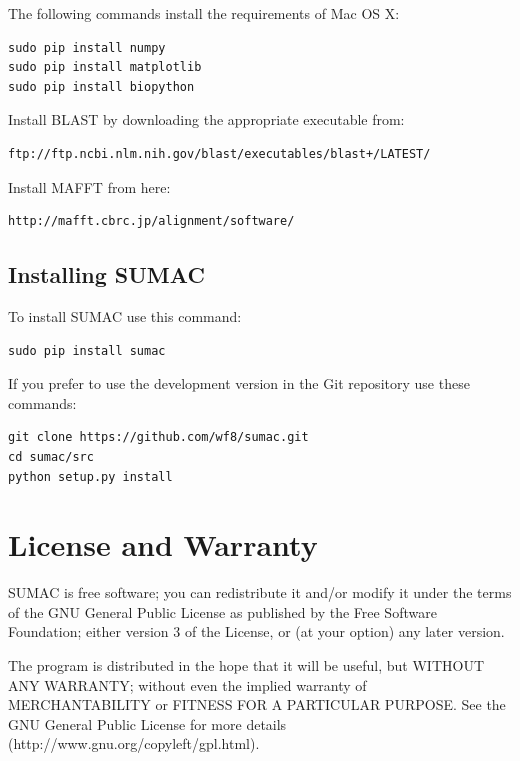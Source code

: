 \documentclass[10pt]{report}
\begin{document}
The following commands install the requirements of Mac OS X:

\begin{verbatim}
sudo pip install numpy
sudo pip install matplotlib
sudo pip install biopython
\end{verbatim}

Install BLAST by downloading the appropriate executable from:

\begin{verbatim}
ftp://ftp.ncbi.nlm.nih.gov/blast/executables/blast+/LATEST/
\end{verbatim}

Install MAFFT from here:

\begin{verbatim}
http://mafft.cbrc.jp/alignment/software/
\end{verbatim}


\subsection{Installing SUMAC}

To install SUMAC use this command:

\begin{verbatim}
sudo pip install sumac
\end{verbatim}

If you prefer to use the development version in the Git repository
use these commands:

\begin{verbatim}
git clone https://github.com/wf8/sumac.git
cd sumac/src
python setup.py install
\end{verbatim}

\section{License and Warranty}

SUMAC is free software; you can redistribute it and/or modify it under the terms of the GNU General Public License as published by the Free Software Foundation; either version 3 of the License, or (at your option) any later version.

The program is distributed in the hope that it will be useful, but WITHOUT ANY WARRANTY; without even the implied warranty of MERCHANTABILITY or FITNESS FOR A PARTICULAR PURPOSE. See the GNU General Public License for more details \\ (http://www.gnu.org/copyleft/gpl.html).
\end{document}
